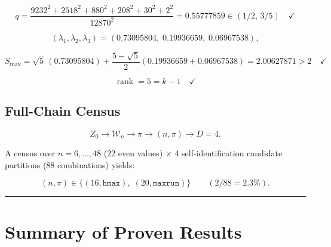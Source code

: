 \documentclass[
  11pt,
]{article}
\begin{document}
\[
q = \frac{9232^2+2518^2+880^2+208^2+30^2+2^2}{12870^2} = \mathbf{0.55777859} \in (1/2,\,3/5) \quad\checkmark
\tag{7.10}
\]

\[
(\lambda_1,\lambda_2,\lambda_3) = (0.73095804,\;0.19936659,\;0.06967538),
\tag{7.11}
\]

\[
S_{\max} = \sqrt5\,(0.73095804)+\frac{5-\sqrt5}{2}(0.19936659+0.06967538) = \mathbf{2.00627871}>2 \quad\checkmark
\tag{7.12}
\]

\[
\operatorname{rank}=5=k-1 \quad\checkmark
\tag{7.13}
\]

\subsection{Full-Chain Census}\label{full-chain-census}

\[
Z_0 \longrightarrow \mathcal{W}_n \longrightarrow \pi \longrightarrow (n,\pi) \longrightarrow D=4.
\tag{7.14}
\]

A census over \(n=6,\dots,48\) (22 even values) \(\times\) 4
self-identification candidate partitions (88 combinations) yields:

\[
(n,\pi)\in\{(16,\texttt{hmax}),\;(20,\texttt{maxrun})\} \qquad (2/88 = 2.3\%).
\tag{7.15}
\]

\begin{center}\rule{0.5\linewidth}{0.5pt}\end{center}

\section{Summary of Proven
Results}\label{summary-of-proven-results}
\end{document}

